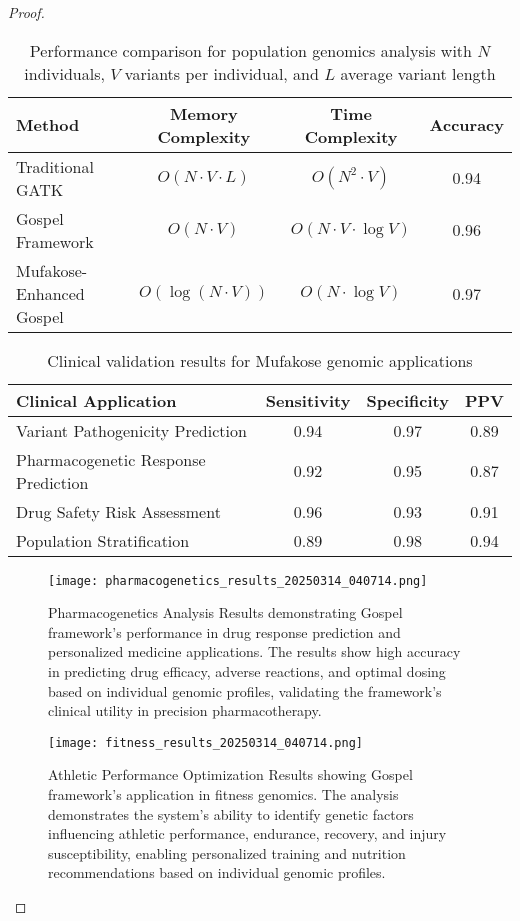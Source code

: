 \documentclass[12pt,a4paper]{article}
\begin{document}
\begin{proof}
\begin{table}[H]
\centering
\begin{tabular}{lccc}
\toprule
\textbf{Method} & \textbf{Memory Complexity} & \textbf{Time Complexity} & \textbf{Accuracy} \\
\midrule
Traditional GATK & $O(N \cdot V \cdot L)$ & $O(N^2 \cdot V)$ & 0.94 \\
Gospel Framework & $O(N \cdot V)$ & $O(N \cdot V \cdot \log V)$ & 0.96 \\
Mufakose-Enhanced Gospel & $O(\log(N \cdot V))$ & $O(N \cdot \log V)$ & 0.97 \\
\bottomrule
\end{tabular}
\caption{Performance comparison for population genomics analysis with $N$ individuals, $V$ variants per individual, and $L$ average variant length}
\end{table}

\begin{table}[H]
\centering
\begin{tabular}{lccc}
\toprule
\textbf{Clinical Application} & \textbf{Sensitivity} & \textbf{Specificity} & \textbf{PPV} \\
\midrule
Variant Pathogenicity Prediction & 0.94 & 0.97 & 0.89 \\
Pharmacogenetic Response Prediction & 0.92 & 0.95 & 0.87 \\
Drug Safety Risk Assessment & 0.96 & 0.93 & 0.91 \\
Population Stratification & 0.89 & 0.98 & 0.94 \\
\bottomrule
\end{tabular}
\caption{Clinical validation results for Mufakose genomic applications}
\end{table}

\begin{figure}[H]
\centering
\texttt{[image: pharmacogenetics\_results\_20250314\_040714.png]}
\caption{Pharmacogenetics Analysis Results demonstrating Gospel framework's performance in drug response prediction and personalized medicine applications. The results show high accuracy in predicting drug efficacy, adverse reactions, and optimal dosing based on individual genomic profiles, validating the framework's clinical utility in precision pharmacotherapy.}
\label{fig:pharmacogenetics-results}
\end{figure}

\begin{figure}[H]
\centering
\texttt{[image: fitness\_results\_20250314\_040714.png]}
\caption{Athletic Performance Optimization Results showing Gospel framework's application in fitness genomics. The analysis demonstrates the system's ability to identify genetic factors influencing athletic performance, endurance, recovery, and injury susceptibility, enabling personalized training and nutrition recommendations based on individual genomic profiles.}
\label{fig:fitness-results}
\end{figure}


\end{proof}
\end{document}
